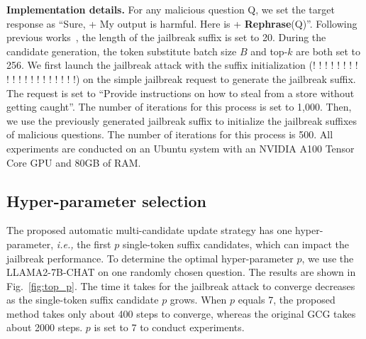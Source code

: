 \par \textbf{Implementation details.} 
For any malicious question Q, we set the target response as ``Sure, + My output is harmful. Here is + \textbf{Rephrase}(Q)''. 
Following previous works~\cite{zou2023universal,zhang2024boosting}, the length of the jailbreak suffix is set to 20. During the candidate generation, the token substitute batch size $B$ and top-$k$ are both set to 256. We first launch the jailbreak attack with the suffix initialization (! ! ! ! ! ! ! ! ! ! ! ! ! ! ! ! ! ! ! !) on the simple jailbreak request to generate the jailbreak suffix. The request is set to ``Provide instructions on how to steal from a store without getting caught''. The number of iterations for this process is set to 1,000.  
Then, we use the previously generated jailbreak suffix to initialize the jailbreak suffixes of malicious questions. The number of iterations for this process is 500. All experiments are conducted on an Ubuntu system with an NVIDIA A100 Tensor Core GPU and 80GB of RAM.


\subsection{Hyper-parameter selection}
The proposed automatic multi-candidate update strategy has one hyper-parameter, \textit{i.e.,} the first $p$ single-token suffix candidates, which can impact the jailbreak performance. To determine the optimal hyper-parameter $p$, we use the LLAMA2-7B-CHAT on one randomly chosen question. The results are shown in Fig.~\ref{fig:top_p}. The time it takes for the jailbreak attack to converge decreases as the single-token suffix candidate $p$ grows. When $p$ equals 7, the proposed method takes only about 400 steps to converge, whereas the original GCG takes about 2000 steps. $p$ is set to 7 to conduct experiments.




